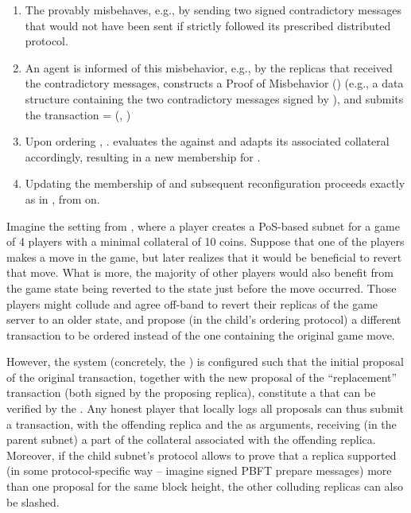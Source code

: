 \begin{enumerate}
    
    \item The  provably misbehaves, e.g., by sending two signed contradictory messages
    that would not have been sent if  strictly followed its prescribed distributed protocol.

    \item An \ipc agent is informed of this misbehavior, e.g., by the replicas that received the contradictory messages,
    constructs a Proof of Misbehavior () (e.g., a data structure containing the two contradictory messages signed by ),
    and submits the transaction  = (, )

    \item Upon ordering , . evaluates the  against 
    and adapts its associated collateral accordingly, resulting in a new membership for .

    \item Updating the membership of  and subsequent reconfiguration proceeds exactly as in , from  on.

\end{enumerate}

\begin{example}
Imagine the setting from , where a player creates a PoS-based subnet for a game of 4 players with a minimal collateral of 10 coins.
Suppose that one of the players makes a move in the game, but later realizes that it would be beneficial to revert that move.
What is more, the majority of other players would also benefit from the game state being reverted to the state just before the move occurred.
Those players might collude and agree off-band to revert their replicas of the game server to an older state,
and propose (in the child's ordering protocol) a different transaction to be ordered instead of the one containing the original game move.

However, the system (concretely, the \saFull) is configured such that the initial proposal of the original transaction,
together with the new proposal of the ``replacement'' transaction (both signed by the proposing replica),
constitute a \pom that can be verified by the \sa.
Any honest player that locally logs all proposals can thus submit a  transaction, with the offending replica and the \pom as arguments,
receiving (in the parent subnet) a part of the collateral associated with the offending replica.
Moreover, if the child subnet's protocol allows to prove that a replica supported
(in some protocol-specific way -- imagine signed PBFT prepare messages)
more than one proposal for the same block height, the other colluding replicas can also be slashed.
\end{example}
